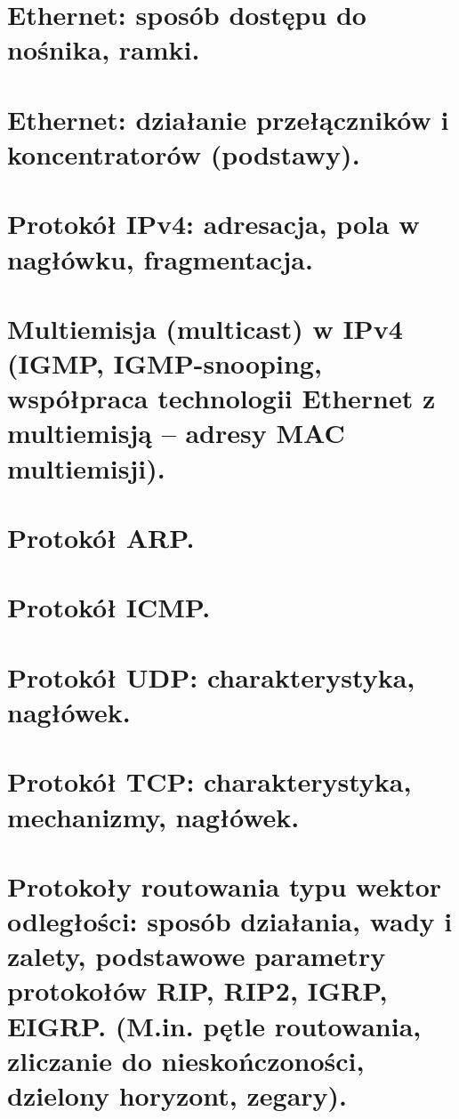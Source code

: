 \documentclass[a4paper]{article}
\begin{document}
    \section{Ethernet: sposób dostępu do nośnika, ramki.}
    


    \section{Ethernet: działanie przełączników i koncentratorów (podstawy).}
    


    \section{Protokół IPv4: adresacja, pola w nagłówku, fragmentacja.}
    

    \section{Multiemisja (multicast) w IPv4 (IGMP, IGMP-snooping, współpraca technologii Ethernet z
    multiemisją – adresy MAC multiemisji).}
    


    \section{Protokół ARP.}
    


    \section{Protokół ICMP.}
    


    \section{Protokół UDP: charakterystyka, nagłówek.}
    


    \section{Protokół TCP: charakterystyka, mechanizmy, nagłówek.}
    

    \section{Protokoły routowania typu wektor odległości: sposób działania, wady i zalety,
    podstawowe parametry protokołów RIP, RIP2, IGRP, EIGRP. (M.in. pętle routowania,
    zliczanie do nieskończoności, dzielony horyzont, zegary).}
    
\end{document}
